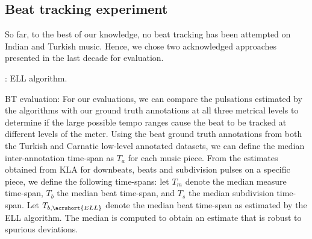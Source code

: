 \subsection{Beat tracking experiment} %
So far, to the best of our knowledge, no beat tracking has been attempted on Indian and Turkish music. Hence, we chose two acknowledged approaches presented in the last decade \cite{klapuri:06:meter,ellis:07:beat} for evaluation. 

: \acrshort{ELL} algorithm.

BT evaluation: For our evaluations, we can compare the pulsations estimated by the algorithms with our ground truth annotations at all three metrical levels to determine if the large possible tempo ranges cause the beat to be tracked at different levels of the meter. Using the beat ground truth annotations from both the Turkish and Carnatic low-level annotated datasets, we can define the median inter-annotation time-span as $T_a$ for each music piece. From the estimates obtained from \acrshort{KLA} for downbeats, beats and subdivision pulses on a specific piece, we define the following time-spans: let $T_m$ denote the median measure time-span, $T_b$ the median beat time-span, and $T_s$ the median subdivision time-span. Let $T_{b,\acrshort{ELL}}$ denote the median beat time-span as estimated by the \acrshort{ELL} algorithm. The median is computed to obtain an estimate that is robust to spurious deviations. 
